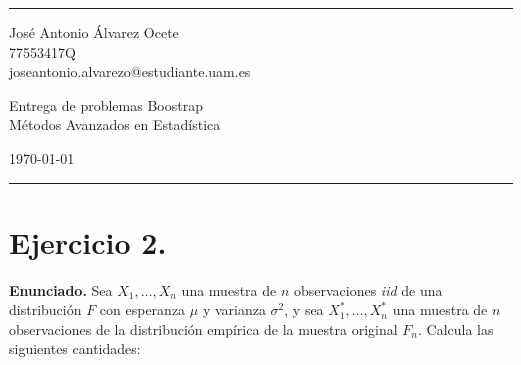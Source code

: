 \documentclass[a4paper]{article}
\begin{document}

\fancyhead[C]{}
\hrule \medskip %
\begin{minipage}{0.295\textwidth} 
\raggedright
\footnotesize
José Antonio Álvarez Ocete \hfill\\   
77553417Q \hfill\\
joseantonio.alvarezo@estudiante.uam.es
\end{minipage}
\begin{minipage}{0.4\textwidth} 
\centering 
\large 
Entrega de problemas Boostrap\\ 
\normalsize 
Métodos Avanzados en Estadística\\ 
\end{minipage}
\begin{minipage}{0.295\textwidth} 
\raggedleft
\today\hfill\\
\end{minipage}
\medskip\hrule 
\bigskip
	

\section*{Ejercicio 2.}

\textbf{Enunciado.} Sea $X_1, \ldots, X_n$ una muestra de $n$ observaciones \emph{iid} de una distribución $F$ con esperanza $\mu$ y varianza $\sigma^2$, y sea $X_1^*, \ldots, X_n^*$ una muestra de $n$ observaciones de la distribución empírica de la muestra original $F_n$. Calcula las siguientes cantidades: \\
\end{document}
